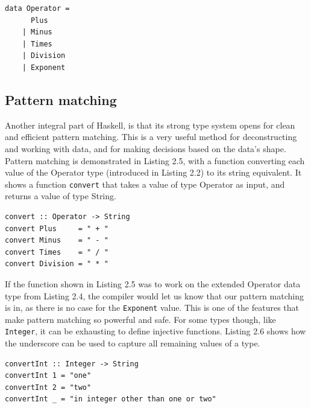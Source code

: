 \begin{lstlisting}[caption={An extended version of the Operator data type presented in Listing 2.2}, captionpos=b]
data Operator =
      Plus
    | Minus
    | Times
    | Division
    | Exponent
\end{lstlisting}

\subsection{Pattern matching}

Another integral part of Haskell, is that its strong type system opens for clean and efficient pattern matching. This is a very useful method for deconstructing and working with data, and for making decisions based on the data's shape. \hfill \\

Pattern matching is demonstrated in Listing 2.5, with a function converting each value of the Operator type (introduced in Listing 2.2) to its string equivalent. It shows a function \texttt{convert} that takes a value of type Operator as input, and returns a value of type String. \hfill \\

\begin{lstlisting}[caption={Haskell function converting values of one type to another}, captionpos=b]
convert :: Operator -> String
convert Plus     = " + "
convert Minus    = " - "
convert Times    = " / "
convert Division = " * "
\end{lstlisting}

If the function shown in Listing 2.5 was to work on the extended Operator data type from Listing 2.4, the compiler would let us know that our pattern matching is in, as there is no case for the \texttt{Exponent} value. This is one of the features that make pattern matching so powerful and safe. For some types though, like \texttt{Integer}, it can be exhausting to define injective functions. Listing 2.6 shows how the underscore can be used to capture all remaining values of a type. \hfill \\

\begin{lstlisting}[caption={A simple Haskell function converting values of type Integer to its string equivalent}, captionpos=b]
convertInt :: Integer -> String
convertInt 1 = "one"
convertInt 2 = "two"
convertInt _ = "in integer other than one or two"
\end{lstlisting}

